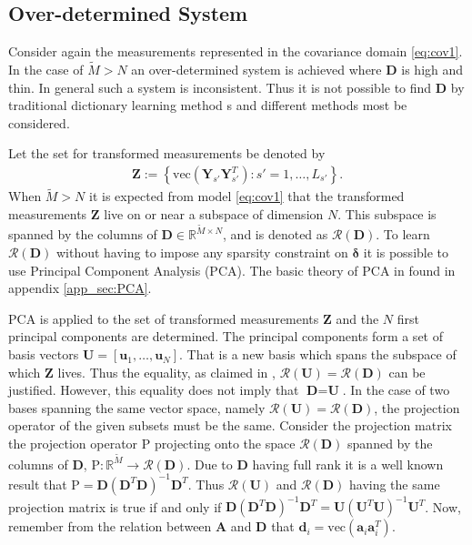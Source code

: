 \subsection{Over-determined System}\label{sec:over_det}
Consider again the measurements represented in the covariance domain \eqref{eq:cov1}.
In the case of $\widetilde{M} > N$ an over-determined system is achieved where $\textbf{D}$ is high and thin. In general such a system is inconsistent. Thus it is not possible to find $\textbf{D}$ by traditional dictionary learning method	s and different methods most be considered.

Let the set for transformed measurements be denoted by 
\begin{align*}
\textbf{Z} := \left\{\text{vec}\left( \mathbf{Y}_{s'} \mathbf{Y}_{s'}^T \right) : s' = 1, \hdots, L_{s'} \right\}.
\end{align*}
When $ \widetilde{M} > N $ it is expected from model \eqref{eq:cov1} that the transformed measurements $\textbf{Z}$ live on or near a subspace of dimension $N$. 
This subspace is spanned by the columns of $\textbf{D}\in\mathbb{R}^{\widetilde{M}\times N}$, and is denoted as $\mathcal{R}(\textbf{D})$. 
To learn $\mathcal{R}(\textbf{D})$ without having to impose any sparsity constraint on $\boldsymbol{\delta}$ it is possible to use Principal Component Analysis (PCA). The basic theory of PCA in found in appendix \ref{app_sec:PCA}. 

PCA is applied to the set of transformed measurements $\textbf{Z}$ and the $N$ first principal components are determined. The principal components form a set of basis vectors $\textbf{U}=[\textbf{u}_1,\hdots, \textbf{u}_N]$. That is a new basis which spans the subspace of which $\textbf{Z}$ lives. Thus the equality, as claimed in \cite{Balkan2015}, $\mathcal{R}(\textbf{U})=\mathcal{R}(\textbf{D})$ can be justified.  
However, this equality does not imply that $\textbf{D}=\textbf{U}$. 
In the case of two bases spanning the same vector space, namely $\mathcal{R}(\textbf{U})=\mathcal{R}(\textbf{D})$, the projection operator of the given subsets must be the same. 
Consider the projection matrix the projection operator $\text{P}$ projecting onto the space $\mathcal{R}(\textbf{D})$ spanned by the columns of $\textbf{D}$, $\text{P}:\mathbb{R}^{\widetilde{M}}\rightarrow \mathcal{R}(\textbf{D})$. Due to $\textbf{D}$ having full rank it is a well known result that $\text{P} = \textbf{D}(\textbf{D}^T\textbf{D})^{-1}\textbf{D}^T$. 
Thus $\mathcal{R}(\textbf{U})$ and $\mathcal{R}(\textbf{D})$ having the same projection matrix is true if and only if $\textbf{D}(\textbf{D}^T\textbf{D})^{-1}\textbf{D}^T=\textbf{U}(\textbf{U}^T\textbf{U})^{-1}\textbf{U}^T$. 
Now, remember from the relation between $\textbf{A}$ and $\textbf{D}$ that $\textbf{d}_i = \text{vec}(\textbf{a}_i\textbf{a}_i^T)$. 

